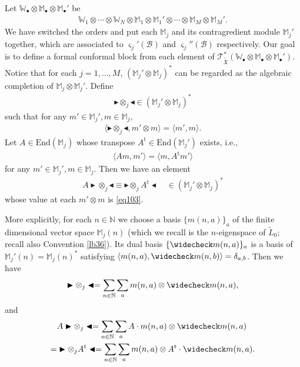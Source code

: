 \documentclass[12pt,b5paper,notitlepage]{report}
\theoremstyle{definition}
\theoremstyle{plain}
\newcommand{\fk}{\mathfrak}
\newcommand{\mc}{\mathcal}
\newcommand{\wtd}{\widetilde}
\newcommand{\wch}{\widecheck}
\newcommand{\tr}{\mathrm{t}} %
\newcommand{\End}{\mathrm{End}} %
\newcommand{\bk}[1]{\langle {#1}\rangle}
\newcommand{\scr}{\mathscr}
\newcommand{\sgm}{\varsigma}
\newcommand{\blt}{\bullet}
\newcommand{\Wbb}{\mathbb W}
\newcommand{\Mbb}{\mathbb M}
\newcommand{\Nbb}{\mathbb N}
\newcommand{\btl}{\blacktriangleleft}
\newcommand{\btr}{\blacktriangleright}
\numberwithin{equation}{section}
\begin{document}
Let $\Wbb_\blt\otimes \Mbb_\blt\otimes\Mbb_\blt'$ be
\begin{align}
\Wbb_1\otimes\cdots\otimes \Wbb_N\otimes\Mbb_1\otimes\Mbb_1'\otimes\cdots\otimes\Mbb_M\otimes\Mbb_M'.
\end{align}
We have switched the orders and put each $\Mbb_j$ and its contragredient module $\Mbb_j'$ together, which are associated to $\sgm_j'(\mc B)$ and $\sgm_j''(\mc B)$ respectively. Our goal is to define a formal conformal block from each element of $\scr T_{\wtd{\fk X}}^*(\Wbb_\blt\otimes \Mbb_\blt\otimes\Mbb_\blt')$. Notice that for each  $j=1,\dots,M$, $(\Mbb_j'\otimes\Mbb_j)^*$ can be regarded as the algebraic completion of $\Mbb_j\otimes\Mbb_j'$. Define \index{zzz@$\btr\otimes_j\btl$}
\begin{align*}
\btr\otimes_j\btl\in (\Mbb_j'\otimes\Mbb_j)^*
\end{align*}
such that for any $m'\in\Mbb_j',m\in\Mbb_j$,
\begin{align*}
\bk{\btr\otimes_j\btl,m'\otimes m}=\bk{m',m}.
\end{align*}
Let $A\in\End(\Mbb_j)$ whose transpose $A^\tr\in\End(\Mbb_j')$ exists, i.e.,
\begin{align}
\bk{Am,m'}=\bk{m,A^\tr m'}\label{eq103}
\end{align}
for any $m'\in\Mbb_j',m\in\Mbb_j$. Then we have an element
\begin{align}
A\btr\otimes_j\btl\equiv \btr\otimes_j A^\tr\btl\quad\in (\Mbb_j'\otimes\Mbb_j)^*\label{eq108}
\end{align}
whose value at each $m'\otimes m$ is \eqref{eq103}.


More explicitly, for each $n\in\Nbb$ we choose a basis $\{m(n,a)\}_a$ of the finite dimensional vector space $\Mbb_j(n)$ (which we recall is the $n$-eigenspace of $\wtd L_0$; recall also Convention \ref{lb36}). Its dual basis $\{\wch m(n,a)\}_a$ is a basis of $\Mbb_j'(n)=\Mbb_j(n)^*$ satisfying $\bk{m(n,a),\wch m(n,b)}=\delta_{a,b}$. Then we have
\begin{gather*}
\btr\otimes_j\btl=\sum_{n\in\Nbb}\sum_am(n,a)\otimes\wch m(n,a),
\end{gather*}
and
\begin{align*}
&A\btr\otimes_j\btl=\sum_{n\in\Nbb}\sum_a A\cdot m(n,a)\otimes\wch m(n,a)\\
=& \btr\otimes_j A^\tr\btl=\sum_{n\in\Nbb}\sum_am(n,a)\otimes A^\tr\cdot \wch m(n,a).
\end{align*}
\end{document}
